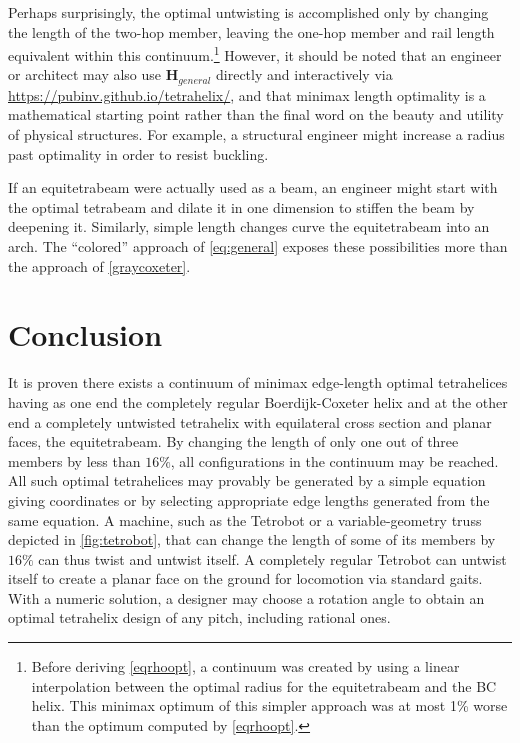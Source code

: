 \documentclass[10pt,final]{journals-1.0/asme2ej}
\renewcommand{\vec}[1]{\mathbf{#1}}
\begin{document}
Perhaps surprisingly, the optimal untwisting is accomplished only by
changing the length of the two-hop member, leaving the one-hop member
and rail length equivalent within this continuum.\footnote{Before
deriving  \cref{eqrhoopt}, a continuum was created by
using a linear interpolation between the optimal radius for the
equitetrabeam and the BC helix. This minimax optimum of this simpler
approach was at most 1\% worse than the optimum computed by
\cref{eqrhoopt}.}
 However, it should
be noted that an engineer or architect may also use $\vec{H}_{general}$ 
directly and interactively via \url{https://pubinv.github.io/tetrahelix/},
and that minimax length optimality is a
mathematical starting point rather than the final word on the beauty and utility of
physical structures. For example, a structural engineer might increase a
radius past optimality in order to resist buckling.

If an equitetrabeam were actually
used as a beam, an engineer might start with the optimal tetrabeam and
dilate it in one dimension to stiffen the beam by deepening it. Similarly, simple
length changes curve the equitetrabeam into an arch.
The ``colored'' approach of  \cref{eq:general} exposes these possibilities
more than the approach of  \cref{graycoxeter}.


\section{Conclusion}

It is proven there exists a continuum of minimax edge-length optimal tetrahelices
having as one end the completely regular Boerdijk-Coxeter helix and at the
other end a completely untwisted tetrahelix with equilateral cross
section and planar faces, the equitetrabeam.
By changing the length of only one out of three members by less than $16\%$,
all configurations in the continuum may be reached.
All such optimal tetrahelices may provably be generated by a
simple equation giving coordinates or by
selecting appropriate edge lengths generated from the same equation. 
A machine, such as the Tetrobot or a variable-geometry truss  depicted in \cref{fig:tetrobot},
that can change
the length of some of its members by $16\%$ can thus twist and untwist itself.
A completely regular Tetrobot can untwist itself to create a planar
face on the ground for locomotion via standard gaits.
With a numeric solution, a designer may choose
a rotation angle to obtain an optimal tetrahelix design
of any pitch, including rational ones.
\end{document}
